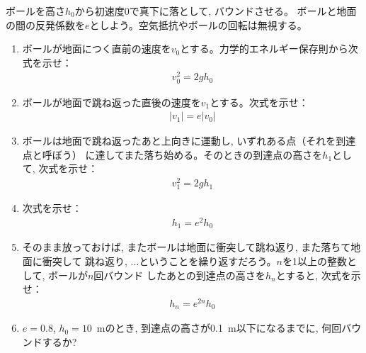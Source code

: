 %
\begin{q}\label{q:ball_bound}
ボールを高さ$h_0$から初速度0で真下に落として, バウンドさせる。
ボールと地面の間の反発係数を$e$としよう。空気抵抗やボールの回転は無視する。
\begin{enumerate}
\item ボールが地面につく直前の速度を$v_0$とする。力学的エネルギー保存則から次式を示せ：
\begin{eqnarray}v_0^2=2gh_0\label{eq:ball_bound1}\end{eqnarray}
\item ボールが地面で跳ね返った直後の速度を$v_1$とする。次式を示せ：
\begin{eqnarray}|v_1|=e|v_0|\label{eq:ball_bound2}\end{eqnarray}
\item ボールは地面で跳ね返ったあと上向きに運動し, いずれある点（それを到達点と呼ぼう）
に達してまた落ち始める。そのときの到達点の高さを$h_1$として, 次式を示せ：
\begin{eqnarray}v_1^2=2gh_1\label{eq:ball_bound3}\end{eqnarray}
\item 次式を示せ：
\begin{eqnarray}h_1=e^2h_0\label{eq:ball_bound4}\end{eqnarray}
\item そのまま放っておけば, またボールは地面に衝突して跳ね返り, また落ちて地面に衝突して
跳ね返り, ...ということを繰り返すだろう。$n$を1以上の整数として, ボールが$n$回バウンド
したあとの到達点の高さを$h_n$とすると, 次式を示せ：
\begin{eqnarray}h_n=e^{2n}h_0\label{eq:ball_bound5}\end{eqnarray}
\item $e=0.8$, $h_0=10$~mのとき, 到達点の高さが0.1~m以下になるまでに, 何回バウンドするか? 
\end{enumerate}
\end{q}
\mv

